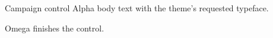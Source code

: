 \documentclass[11pt,aspectratio=169]{beamer}
\date{}
\begin{document}
\begin{frame}{Campaign control}
Alpha body text with the theme's requested typeface.

Omega finishes the control.
\end{frame}
\end{document}
